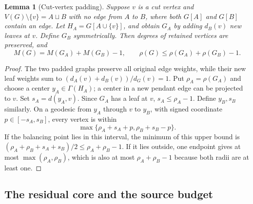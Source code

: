 \documentclass[11pt,a4paper]{article}
\newtheorem{lemma}[theorem]{Lemma}
\theoremstyle{definition}\newtheorem{definition}[theorem]{Definition}
\theoremstyle{remark}\newtheorem{remark}[theorem]{Remark}
\begin{document}
\begin{lemma}[Cut-vertex padding]\label{lem:g7-padding}
Suppose $v$ is a cut vertex and $V(G)\setminus\{v\}=A\sqcup B$ with no
edge from $A$ to $B$, where both $G[A]$ and $G[B]$ contain an edge.
Let $H_A=G[A\cup\{v\}]$, and obtain $G_A$ by adding $d_B(v)$ new leaves
at $v$. Define $G_B$ symmetrically. Then degrees of retained vertices
are preserved, and
\[
 M(G)=M(G_A)+M(G_B)-1,
 \qquad \rho(G)\le\rho(G_A)+\rho(G_B)-1.
\]
\end{lemma}
\begin{proof}
The two padded graphs preserve all original edge weights, while their
new leaf weights sum to $(d_A(v)+d_B(v))/d_G(v)=1$.
Put $\rho_A=\rho(G_A)$ and choose a center $y_A\in\Gamma(H_A)$;
a center in a new pendant edge can be projected to $v$. Set
$s_A=d(y_A,v)$. Since $G_A$ has a leaf at $v$, $s_A\le\rho_A-1$.
Define $y_B,s_B$ similarly. On a geodesic from $y_A$ through $v$ to
$y_B$, with signed coordinate $p\in[-s_A,s_B]$, every vertex is within
\[
 \max\{\rho_A+s_A+p,\rho_B+s_B-p\}.
\]
If the balancing point lies in this interval, the minimum of this
upper bound is $(\rho_A+\rho_B+s_A+s_B)/2\le\rho_A+\rho_B-1$.
If it lies outside, one endpoint gives at most $\max(\rho_A,\rho_B)$,
which is also at most $\rho_A+\rho_B-1$ because both radii are at least
one.
\end{proof}

\subsection{The residual core and the source budget}
\end{document}
